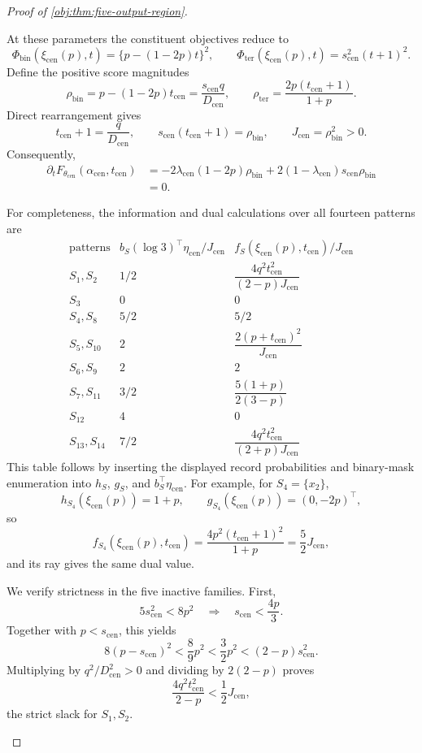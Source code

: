 \documentclass[11pt]{article}
\begin{document}
\begin{proof}[Proof of \cref{obj:thm:five-output-region}]
\begin{enumerate}
At these parameters the constituent objectives reduce to
\[
\Phi_{\mathrm{bin}}(\xi_{\mathrm{cen}}(p),t)
=\{p-(1-2p)t\}^2,
\qquad
\Phi_{\mathrm{ter}}(\xi_{\mathrm{cen}}(p),t)
=s_{\mathrm{cen}}^2(t+1)^2.
\]
Define the positive score magnitudes
\[
\rho_{\mathrm{bin}}
=p-(1-2p)t_{\mathrm{cen}}
=\frac{s_{\mathrm{cen}}q}{D_{\mathrm{cen}}},
\qquad
\rho_{\mathrm{ter}}
=\frac{2p(t_{\mathrm{cen}}+1)}{1+p}.
\]
Direct rearrangement gives
\[
t_{\mathrm{cen}}+1=\frac{q}{D_{\mathrm{cen}}},
\qquad
s_{\mathrm{cen}}(t_{\mathrm{cen}}+1)=\rho_{\mathrm{bin}},
\qquad
J_{\mathrm{cen}}=\rho_{\mathrm{bin}}^2>0.
\]
Consequently,
\[
\begin{aligned}
\partial_tF_{\theta_{\mathrm{cen}}}
(\alpha_{\mathrm{cen}},t_{\mathrm{cen}})
&=-2\lambda_{\mathrm{cen}}(1-2p)\rho_{\mathrm{bin}}
  +2(1-\lambda_{\mathrm{cen}})s_{\mathrm{cen}}\rho_{\mathrm{bin}}\\
&=0.
\end{aligned}
\]

For completeness, the information and dual calculations over all
fourteen patterns are
\[
\begin{array}{c|c|c}
\text{patterns}
&b_S(\log3)^\top\eta_{\mathrm{cen}}/J_{\mathrm{cen}}
&f_S(\xi_{\mathrm{cen}}(p),t_{\mathrm{cen}})/J_{\mathrm{cen}}\\ \hline
S_1,S_2&1/2&
\dfrac{4q^2t_{\mathrm{cen}}^2}{(2-p)J_{\mathrm{cen}}}\\
S_3&0&0\\
S_4,S_8&5/2&5/2\\
S_5,S_{10}&2&
\dfrac{2(p+t_{\mathrm{cen}})^2}{J_{\mathrm{cen}}}\\
S_6,S_9&2&2\\
S_7,S_{11}&3/2&
\dfrac{5(1+p)}{2(3-p)}\\
S_{12}&4&0\\
S_{13},S_{14}&7/2&
\dfrac{4q^2t_{\mathrm{cen}}^2}{(2+p)J_{\mathrm{cen}}}
\end{array}
\]
This table follows by inserting the displayed record probabilities and
binary-mask enumeration into \(h_S\), \(g_S\), and \(b_S^\top\eta_{\mathrm{cen}}\).
For example, for \(S_4=\{x_2\}\),
\[
h_{S_4}(\xi_{\mathrm{cen}}(p))=1+p,\qquad
g_{S_4}(\xi_{\mathrm{cen}}(p))=(0,-2p)^\top,
\]
so
\[
f_{S_4}(\xi_{\mathrm{cen}}(p),t_{\mathrm{cen}})
=
\frac{4p^2(t_{\mathrm{cen}}+1)^2}{1+p}
=\frac52J_{\mathrm{cen}},
\]
and its ray gives the same dual value.

We verify strictness in the five inactive families. First,
\[
5s_{\mathrm{cen}}^2<8p^2
\quad\Longrightarrow\quad
s_{\mathrm{cen}}<\frac{4p}{3}.
\]
Together with \(p<s_{\mathrm{cen}}\), this yields
\[
8(p-s_{\mathrm{cen}})^2
<
\frac89p^2
<
\frac32p^2
<
(2-p)s_{\mathrm{cen}}^2.
\]
Multiplying by \(q^2/D_{\mathrm{cen}}^2>0\) and dividing by \(2(2-p)\)
proves
\[
\frac{4q^2t_{\mathrm{cen}}^2}{2-p}<\frac12J_{\mathrm{cen}},
\]
the strict slack for \(S_1,S_2\).


\end{enumerate}
\end{proof}
\end{document}
